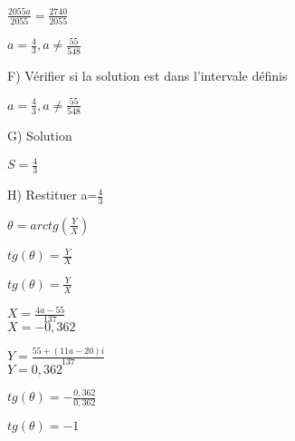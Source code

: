 $\frac{2055a}{2055} = \frac{2740}{2055}$ \\
\vspace{5mm} %

$a=\frac{4}{3}, a \neq \frac{55}{548}$ \\
\vspace{10mm} %

F) Vérifier si la solution est dans l'intervale définis \\
\vspace{2mm} %

$a=\frac{4}{3}, a \neq \frac{55}{548}$ \\
\vspace{5mm} %

G) Solution \\
\vspace{2mm} %

$S = \frac{4}{3}$ \\
\vspace{5mm} %

H) Restituer a=$\frac{4}{3}$ \\
\vspace{2mm} %

$\theta = arctg(\frac{Y}{X})$ \\
\vspace{5mm} %

$tg(\theta) = \frac{Y}{X}$ \\
\vspace{5mm} %


$tg(\theta) = \frac{Y}{X}$ \\
\vspace{5mm} %

$X = \frac{4a-55}{137}$ \\
$X = -0,362$ \\
\vspace{5mm} %

$Y= \frac{55+(11a-20)i}{137}$ \\
$Y= 0,362$ \\
\vspace{5mm} %

$tg(\theta) = - \frac{0,362}{0,362}$ \\
\vspace{5mm} %

$tg(\theta) = -1$ \\
\vspace{5mm} %

